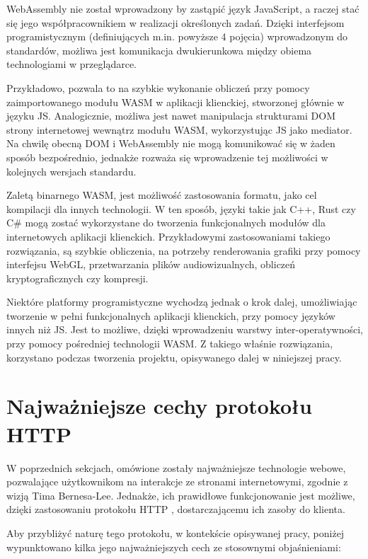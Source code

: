 WebAssembly nie został wprowadzony by zastąpić język JavaScript, a raczej stać się jego współpracownikiem w realizacji określonych zadań. Dzięki interfejsom programistycznym (definiujących m.in. powyższe 4 pojęcia) wprowadzonym do standardów, możliwa jest komunikacja dwukierunkowa między obiema technologiami w przeglądarce.

Przykładowo, pozwala to na szybkie wykonanie obliczeń przy pomocy zaimportowanego modułu WASM w aplikacji klienckiej, stworzonej głównie w języku JS. Analogicznie, możliwa jest nawet manipulacja strukturami DOM strony internetowej wewnątrz modułu WASM, wykorzystując JS jako mediator. Na chwilę obecną DOM i WebAssembly nie mogą komunikować się w żaden sposób bezpośrednio, jednakże rozważa się wprowadzenie tej możliwości w kolejnych wersjach standardu.

Zaletą binarnego WASM, jest możliwość zastosowania formatu, jako cel kompilacji dla innych technologii. W ten sposób, języki takie jak C++, Rust czy C\# mogą zostać wykorzystane do tworzenia funkcjonalnych modułów dla internetowych aplikacji klienckich. Przykładowymi zastosowaniami takiego rozwiązania, są szybkie obliczenia, na potrzeby renderowania grafiki przy pomocy interfejsu WebGL, przetwarzania plików audiowizualnych, obliczeń kryptograficznych czy kompresji.

Niektóre platformy programistyczne wychodzą jednak o krok dalej, umożliwiając tworzenie w pełni funkcjonalnych aplikacji klienckich, przy pomocy języków innych niż JS. Jest to możliwe, dzięki wprowadzeniu warstwy inter-operatywności, przy pomocy pośredniej technologii WASM. Z takiego właśnie rozwiązania, korzystano podczas tworzenia projektu, opisywanego dalej w niniejszej pracy.

\section{Najważniejsze cechy protokołu HTTP}

W poprzednich sekcjach, omówione zostały najważniejsze technologie webowe, pozwalające użytkownikom na interakcje ze stronami internetowymi, zgodnie z wizją Tima Bernesa-Lee. Jednakże, ich prawidłowe funkcjonowanie jest możliwe, dzięki zastosowaniu protokołu HTTP \cite{http.docs}, dostarczającemu ich zasoby do klienta.

Aby przybliżyć naturę tego protokołu, w kontekście opisywanej pracy, poniżej wypunktowano kilka jego najważniejszych cech ze stosownymi objaśnieniami:

